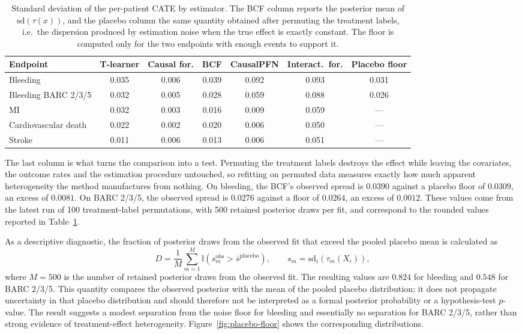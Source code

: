 \begin{table}[H]
\centering
\caption{Standard deviation of the per-patient CATE by estimator. The BCF
column reports the posterior mean of $\mathrm{sd}(\tau(x))$, and the placebo
column the same quantity obtained after permuting the treatment labels, i.e.\
the dispersion produced by estimation noise when the true effect is exactly
constant. The floor is computed only for the two endpoints with enough events
to support it.}
\label{tab:cate-dispersion}
\small
\setlength{\tabcolsep}{4pt}
\begin{tabular}{lccccc|c}
\toprule
Endpoint & T-learner & Causal for. & BCF & CausalPFN & Interact.\ for. & Placebo floor \\
\midrule
Bleeding             & 0.035 & 0.006 & 0.039 & 0.092 & 0.093 & 0.031 \\
Bleeding BARC 2/3/5  & 0.032 & 0.005 & 0.028 & 0.059 & 0.088 & 0.026 \\
MI                   & 0.032 & 0.003 & 0.016 & 0.009 & 0.059 & --- \\
Cardiovascular death & 0.022 & 0.002 & 0.020 & 0.006 & 0.050 & --- \\
Stroke               & 0.011 & 0.006 & 0.013 & 0.006 & 0.051 & --- \\
\bottomrule
\end{tabular}
\end{table}

The last column is what turns the comparison into a test. Permuting the
treatment labels destroys the effect while leaving the covariates, the outcome
rates and the estimation procedure untouched, so refitting on permuted data
measures exactly how much apparent heterogeneity the method manufactures from
nothing. On bleeding, the BCF's observed spread is $0.0390$ against a placebo
floor of $0.0309$, an excess of $0.0081$. On BARC 2/3/5, the observed spread is
$0.0276$ against a floor of $0.0264$, an excess of $0.0012$. These values come
from the latest run of 100 treatment-label permutations, with 500 retained
posterior draws per fit, and correspond to the rounded values reported in
Table~\ref{tab:cate-dispersion}.

As a descriptive diagnostic, the fraction of posterior draws from the observed
fit that exceed the pooled placebo mean is calculated as
\[
D
=
\frac{1}{M}\sum_{m=1}^{M}
\mathbb{I}\!\left(s_m^{\mathrm{obs}}>
\overline{s}^{\mathrm{placebo}}\right),
\qquad
s_m = \mathrm{sd}_i\!\left(\tau_m(X_i)\right),
\]
where $M=500$ is the number of retained posterior draws from the observed fit.
The resulting values are $0.824$ for bleeding and $0.548$ for BARC 2/3/5. This
quantity compares the observed posterior with the mean of the pooled placebo
distribution; it does not propagate uncertainty in that placebo distribution
and should therefore not be interpreted as a formal posterior probability or
a hypothesis-test $p$-value. The result suggests a modest separation from the
noise floor for bleeding and essentially no separation for BARC 2/3/5, rather
than strong evidence of treatment-effect heterogeneity. Figure~\ref{fig:placebo-floor}
shows the corresponding distributions.

